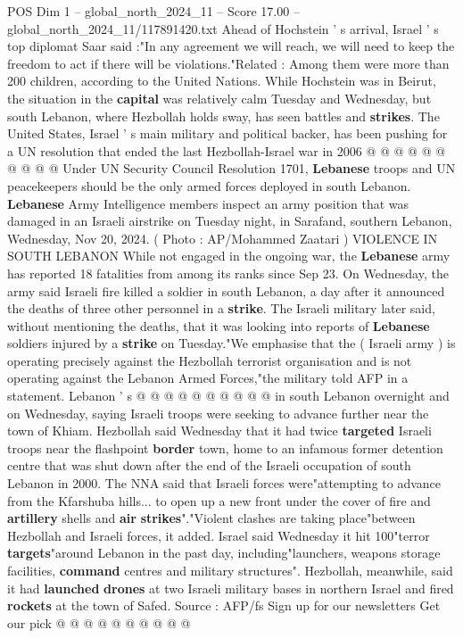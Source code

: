 \begin{textsample}{POS Dim 1 – global\_north\_2024\_11 – Score 17.00 – global\_north\_2024\_11/117891420.txt}
Ahead of Hochstein ' s arrival, Israel ' s top diplomat Saar said :"In any agreement we will reach, we will need to keep the freedom to act if there will be violations."Related : Among them were more than 200 children, according to the United Nations.
While Hochstein was in Beirut, the situation in the \textbf{capital} was relatively calm Tuesday and Wednesday, but south Lebanon, where Hezbollah holds sway, has seen battles and \textbf{strikes}.
The United States, Israel ' s main military and political backer, has been pushing for a UN resolution that ended the last Hezbollah-Israel war in 2006 @ @ @ @ @ @ @ @ @ @ Under UN Security Council Resolution 1701, \textbf{Lebanese} troops and UN peacekeepers should be the only armed forces deployed in south Lebanon. \textbf{Lebanese} Army Intelligence members inspect an army position that was damaged in an Israeli airstrike on Tuesday night, in Sarafand, southern Lebanon, Wednesday, Nov 20, 2024. ( Photo : AP/Mohammed Zaatari ) VIOLENCE IN SOUTH LEBANON While not engaged in the ongoing war, the \textbf{Lebanese} army has reported 18 fatalities from among its ranks since Sep 23.
On Wednesday, the army said Israeli fire killed a soldier in south Lebanon, a day after it announced the deaths of three other personnel in a \textbf{strike}.
The Israeli military later said, without mentioning the deaths, that it was looking into reports of \textbf{Lebanese} soldiers injured by a \textbf{strike} on Tuesday."We emphasise that the ( Israeli army ) is operating precisely against the Hezbollah terrorist organisation and is not operating against the Lebanon Armed Forces,"the military told AFP in a statement.
Lebanon ' s @ @ @ @ @ @ @ @ @ @ in south Lebanon overnight and on Wednesday, saying Israeli troops were seeking to advance further near the town of Khiam.
Hezbollah said Wednesday that it had twice \textbf{targeted} Israeli troops near the flashpoint \textbf{border} town, home to an infamous former detention centre that was shut down after the end of the Israeli occupation of south Lebanon in 2000.
The NNA said that Israeli forces were"attempting to advance from the Kfarshuba hills... to open up a new front under the cover of fire and \textbf{artillery} shells and \textbf{air} \textbf{strikes}"."Violent clashes are taking place"between Hezbollah and Israeli forces, it added.
Israel said Wednesday it hit 100"terror \textbf{targets}"around Lebanon in the past day, including"launchers, weapons storage facilities, \textbf{command} centres and military structures".
Hezbollah, meanwhile, said it had \textbf{launched} \textbf{drones} at two Israeli military bases in northern Israel and fired \textbf{rockets} at the town of Safed.
Source : AFP/fs Sign up for our newsletters Get our pick @ @ @ @ @ @ @ @ @ @

\end{textsample}
